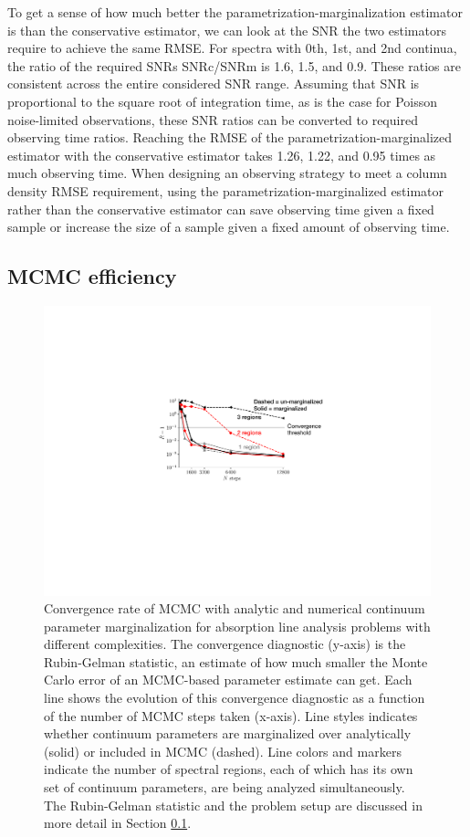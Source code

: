 \documentclass[manuscript]{aastex62}
\begin{document}
To get a sense of how much better the parametrization-marginalization estimator is than the conservative estimator, we can look at the SNR the two estimators require to achieve the same RMSE.
For spectra with 0th, 1st, and 2nd continua, the ratio of the required SNRs SNR$\textrm{c}$/SNR$\textrm{m}$ is 1.6, 1.5, and 0.9.
These ratios are consistent across the entire considered SNR range.
Assuming that SNR is proportional to the square root of integration time, as is the case for Poisson noise-limited observations, these SNR ratios can be converted to required observing time ratios.
Reaching the RMSE of the parametrization-marginalized estimator with the conservative estimator takes 1.26, 1.22, and 0.95 times as much observing time.
When designing an observing strategy to meet a column density RMSE requirement, using the parametrization-marginalized estimator rather than the conservative estimator can save observing time given a fixed sample or increase the size of a sample given a fixed amount of observing time.

\subsection{MCMC efficiency}
\label{sec:MCMC-efficiency}

\begin{figure}
  \includegraphics{convergence.pdf}
  \caption{
  Convergence rate of MCMC with analytic and numerical continuum parameter marginalization for absorption line analysis problems with different complexities.
  The convergence diagnostic (y-axis) is the Rubin-Gelman statistic, an estimate of how much smaller the Monte Carlo error of an MCMC-based parameter estimate can get.
  Each line shows the evolution of this convergence diagnostic as a function of the number of MCMC steps taken (x-axis).
  Line styles indicates whether continuum parameters are marginalized over analytically (solid) or included in MCMC (dashed).
  Line colors and markers indicate the number of spectral regions, each of which has its own set of continuum parameters, are being analyzed simultaneously.
  The Rubin-Gelman statistic and the problem setup are discussed in more detail in Section \ref{sec:MCMC-efficiency}.
  }
  \label{fig:convergence-comparison}
\end{figure}
\end{document}
